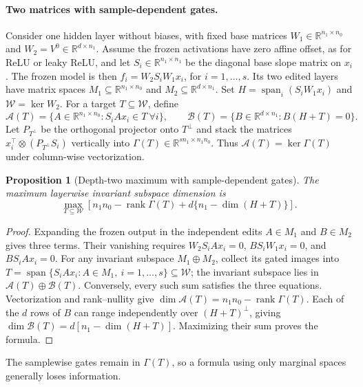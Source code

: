 \documentclass[twoside]{article}
\newtheorem{proposition}[theorem]{Proposition}
\theoremstyle{remark}
\DeclareMathOperator{\rank}{rank}
\DeclareMathOperator{\spanop}{span}
\newcommand{\R}{\mathbb R}
\theoremstyle{highlightdefinition}
\theoremstyle{remark}
\newcommand{\spn}{\spanop}
\begin{document}
\paragraph{Two matrices with sample-dependent gates.}
Consider one hidden layer without biases, with fixed base matrices $W_1\in\R^{n_1\times n_0}$ and $W_2=V^0\in\R^{d\times n_1}$. Assume the frozen activations have zero affine offset, as for ReLU or leaky ReLU, and let $S_i\in\R^{n_1\times n_1}$ be the diagonal base slope matrix on $x_i$. The frozen model is then $f_i=W_2S_iW_1x_i$, for $i=1,\ldots,s$. Its two edited layers have matrix spaces $M_1\subseteq\R^{n_1\times n_0}$ and $M_2\subseteq\R^{d\times n_1}$. Set $H=\spn_i(S_iW_1x_i)$ and $\mathcal W=\ker W_2$. For a target $T\subseteq\mathcal W$, define
\[
 \mathcal A(T)=\{A\in\R^{n_1\times n_0}:S_iAx_i\in T\ \forall i\},\qquad
 \mathcal B(T)=\{B\in\R^{d\times n_1}:B(H+T)=0\}.
\]
Let $P_{T^\perp}$ be the orthogonal projector onto $T^\perp$ and stack the matrices $x_i^\top\otimes(P_{T^\perp}S_i)$ vertically into $\Gamma(T)\in\R^{sn_1\times n_1n_0}$. Thus $\mathcal A(T)=\ker\Gamma(T)$ under column-wise vectorization. 
\begin{proposition}[Depth-two maximum with sample-dependent gates]
The maximum layerwise invariant subspace dimension is
\[
 \max_{T\subseteq\mathcal W}
 \left[n_1n_0-\rank\Gamma(T)+d\{n_1-\dim(H+T)\}\right].
\]
\end{proposition}
\begin{proof}
Expanding the frozen output in the independent edits $A\in M_1$ and $B\in M_2$ gives three terms. Their vanishing requires $W_2S_iAx_i=0$, $BS_iW_1x_i=0$, and $BS_iAx_i=0$. For any invariant subspace $M_1\oplus M_2$, collect its gated images into $T=\spn\{S_iAx_i:A\in M_1,\ i=1,\ldots,s\}\subseteq\mathcal W$; the invariant subspace lies in $\mathcal A(T)\oplus\mathcal B(T)$. Conversely, every such sum satisfies the three equations. Vectorization and rank--nullity give $\dim\mathcal A(T)=n_1n_0-\rank\Gamma(T)$. Each of the $d$ rows of $B$ can range independently over $(H+T)^\perp$, giving $\dim\mathcal B(T)=d[n_1-\dim(H+T)]$. Maximizing their sum proves the formula.
\end{proof}
The samplewise gates remain in $\Gamma(T)$, so a formula using only marginal spaces generally loses information.
\end{document}
